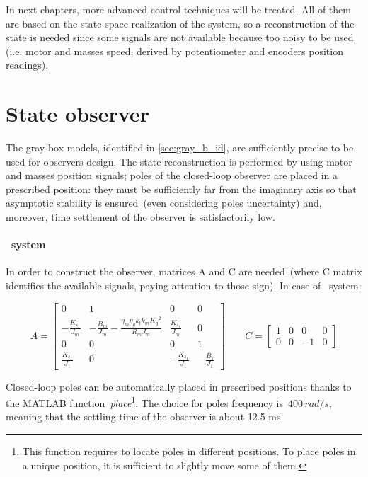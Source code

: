
In next chapters, more advanced control techniques will be treated. All of them are based on the state-space realization of the system, so a reconstruction of the state is needed since some signals are not available because too noisy to be used (i.e. motor and masses speed, derived by potentiometer and encoders position readings).

\section{State observer}

The gray-box models, identified in \cref{sec:gray_b_id}, are sufficiently precise to be used for observers design. The state reconstruction is performed by using motor and masses position signals; poles of the closed-loop observer are placed in a prescribed position: they must be sufficiently far from the imaginary axis so that asymptotic stability is ensured~(even considering poles uncertainty) and, moreover, time settlement of the observer is satisfactorily low.

\paragraph{\onedof\ system}

In order to construct the observer, matrices A and C are needed~(where C matrix identifies the available signals, paying attention to those sign). In case of \onedof\ system:

\begin{equation}
	A = 
	\begin{bmatrix}
		0 &1 & 0 & 0 \\
		-\frac{K_{s_1}}{J_m} & -\frac{B_m}{J_m}-\frac{\eta_m \eta_g k_t k_m {K_g}^2}{R_m J_m}  & \frac{K_{s_1}}{J_m} & 0 \\
		0 & 0 & 0 & 1 \\
		\frac{K_{s_1}}{J_1} & 0 & -\frac{K_{s_1}}{J_1} & -\frac{B_1}{J_1}
	\end{bmatrix}
	\qquad
	C =
	\begin{bmatrix}
		1 & 0 & 0 & 0 \\
		0 & 0 & -1 & 0
	\end{bmatrix}
\label{eqn:1dof_mat_obs}
\end{equation}

Closed-loop poles can be automatically placed in prescribed positions thanks to the MATLAB function~\textit{place}\footnote{This function requires to locate poles in different positions. To place poles in a unique position, it is sufficient to slightly move some of them.}.
The choice for poles frequency is~$400 \, rad/s$, meaning that the settling time of the observer is about 12.5 ms.

